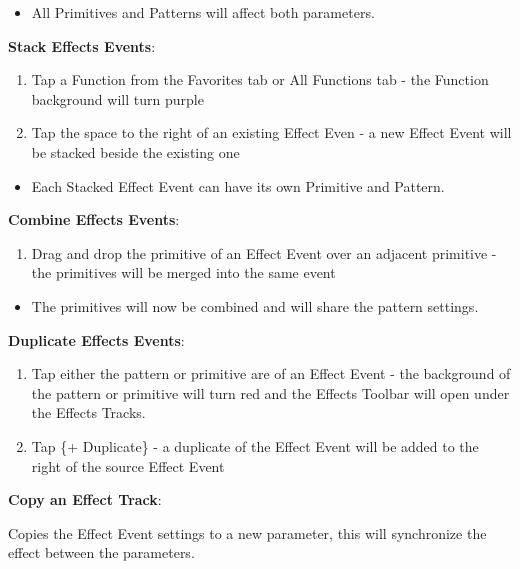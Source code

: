 \documentclass[
]{article}
\providecommand{\tightlist}{%
  \setlength{\itemsep}{0pt}\setlength{\parskip}{0pt}}
\begin{document}
\begin{itemize}
\tightlist
\item
  All Primitives and Patterns will affect both parameters.
\end{itemize}

\textbf{Stack Effects Events}:

\begin{enumerate}
\def\labelenumi{\arabic{enumi}.}
\item
  Tap a Function from the Favorites tab or All Functions tab - the Function background will turn purple
\item
  Tap the space to the right of an existing Effect Even - a new Effect Event will be stacked beside the existing one
\end{enumerate}

\begin{itemize}
\tightlist
\item
  Each Stacked Effect Event can have its own Primitive and Pattern.
\end{itemize}

\textbf{Combine Effects Events}:

\begin{enumerate}
\def\labelenumi{\arabic{enumi}.}
\tightlist
\item
  Drag and drop the primitive of an Effect Event over an adjacent primitive - the primitives will be merged into the same event
\end{enumerate}

\begin{itemize}
\tightlist
\item
  The primitives will now be combined and will share the pattern settings.
\end{itemize}

\textbf{Duplicate Effects Events}:

\begin{enumerate}
\def\labelenumi{\arabic{enumi}.}
\item
  Tap either the pattern or primitive are of an Effect Event - the background of the pattern or primitive will turn red and the Effects Toolbar will open under the Effects Tracks.
\item
  Tap \{+ Duplicate\} - a duplicate of the Effect Event will be added to the right of the source Effect Event
\end{enumerate}

\textbf{Copy an Effect Track}:

Copies the Effect Event settings to a new parameter, this will synchronize the effect between the parameters.
\end{document}
